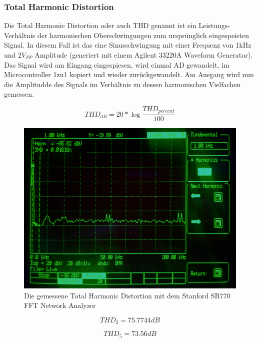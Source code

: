 \subsubsection{Total Harmonic Distortion}
\label{subsubsec:Total Harmonic Distortion}
Die Total Harmonic Distortion oder auch THD genannt ist ein Leistungs-Verhältnis der harmonischen Oberschwingungen zum ursprünglich  eingespeisten Signal. In diesem Fall ist das eine Sinusschwingung mit einer Frequenz von 1kHz und $2\si{V_{PP}}$ Amplitude (generiert mit einem Agilent 33220A Waveform Generator). Das Signal wird am Eingang eingespiesen, wird einmal AD gewandelt, im Microcontroller 1zu1 kopiert und wieder zurückgewandelt. Am Ausgang wird nun die Amplitudde des Signals im Verhältnis zu dessen harmonischen Vielfachen gemessen.

\begin{equation}
THD_{dB}=20*\log{\frac{THD_{percent}}{100}}
\end{equation} 

\begin{figure} [H]
\begin{center}
 \includegraphics[scale=0.1]{../graphics/THD.jpg}
 \caption{Die gemessene Total Harmonic Distortion mit dem Stanford SR770 FFT Network Analyzer}
\label{fig:thd}
\end{center}
\end{figure}

\begin{equation}
THD_2=75.7744\si{dB}
\end{equation} 

\begin{equation}
THD_5=73.56\si{dB}
\end{equation} 

